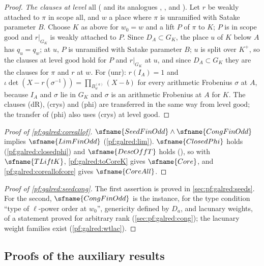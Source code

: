 \begin{proof}
\emph{The clauses at level $\mathrm{all}$} ( and its analogues
, , and ).
Let $r$ be weakly attached to $\pi$ in scope $\mathrm{all}$, and $w$ a place where $\pi$ is unramified with Satake parameter $B$.
Choose $K$ as above for $w_0=w$ and a lift $P$ of $\pi$ to $K$; $P$ is in scope $\mathrm{good}$ and $r|_{G_K}$ is weakly attached to
$P$. Since $D_A\subset G_K$, the place $u$ of $K$ below $A$ has $q_u=q_w$; at $u$,
$P$ is unramified with Satake parameter $B$; $u$ is split over $K^+$, so the clauses at level $\mathrm{good}$ hold for $P$ and
$r|_{G_K}$ at $u$, and since $D_A\subset G_K$ they are the clauses for $\pi$ and $r$ at $w$. For (unr): $r(I_A)=1$ and
$\iota\det(X-r(\sigma^{-1}))=\prod_{B^{(a)}_w}(X-b)$ for every arithmetic Frobenius $\sigma$ at $A$, because $I_A$ and $\sigma$ lie in
$G_K$ and $\sigma$ is an arithmetic Frobenius at $A$ for $K$. The clauses (dR), (crys) and (phi) are transferred in the same way from
level $\mathrm{good}$; the transfer of (phi) also uses (crys) at level $\mathrm{good}$.
\end{proof}

\begin{proof}[Proof of \cref{pf:galred:coreallof}]
$\sfname{SeedFinOdd}\wedge\sfname{CongFinOdd}$ implies $\sfname{LimFinOdd}$ (\cref{pf:galred:lim}). $\sfname{ClosedPhi}$ holds
(\cref{pf:galred:closedphi}) and $\sfname{DescOffT}$ holds
(), so with $\sfname{TLiftK}$, \cref{pf:galred:toCoreK} gives $\sfname{Core}$, and
\cref{pf:galred:coreallofcore} gives $\sfname{CoreAll}$.
\end{proof}

\begin{proof}[Proof of \cref{pf:galred:seedcong}]
The first assertion is proved in \cref{sec:pf:galred:seeds}. For the second, $\sfname{CongFinOdd}$ is the instance, for the
type condition ``type of $\ell$-power order at $w_0$'', genericity defined by $D_a$, and lacunary weights, of a statement
proved for arbitrary rank (\cref{sec:pf:galred:cong}); the lacunary weight families exist (\cref{pf:galred:wtlac}).
\end{proof}

\subsection{Proofs of the auxiliary results}\label{sec:pf:galred:aux}

